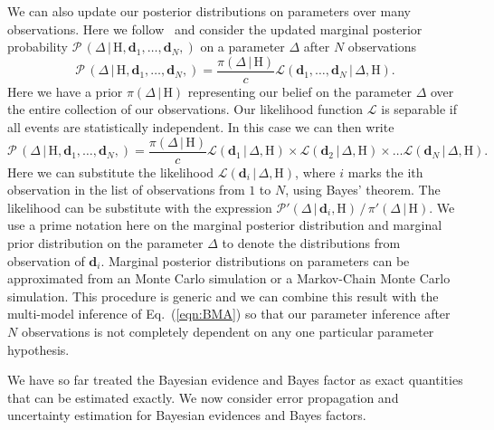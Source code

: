 We can also update our posterior distributions on parameters over many observations. Here we follow~\cite{dpac_technical} and consider the updated marginal posterior probability $\mathcal{P} \, \left(\Delta \, | \, \mathrm{H}, \mathbf{d}_1, \ldots, \mathbf{d}_N, \right)$ on a parameter $\Delta$ after $N$ observations
\begin{equation}
    \mathcal{P} \, \left(\Delta \, | \, \mathrm{H}, \mathbf{d}_1, \ldots, \mathbf{d}_N, \right) = \frac{\pi (\Delta \, | \, \mathrm{H} )}{c} \mathcal{L} (\mathbf{d}_1, \ldots, \mathbf{d}_N \, | \, \Delta , \mathrm{H}). 
\end{equation}
Here we have a prior $\pi (\Delta \, | \, \mathrm{H} )$ representing our belief on the parameter $\Delta$ over the entire collection of our observations. Our likelihood function $\mathcal{L}$ is separable if all events are statistically independent. In this case we can then write
\begin{equation}
    \mathcal{P} \, \left(\Delta \, | \, \mathrm{H}, \mathbf{d}_1, \ldots, \mathbf{d}_N, \right) = \frac{\pi (\Delta \, | \, \mathrm{H} )}{c} \mathcal{L} (\mathbf{d}_1  \, | \, \Delta , \mathrm{H}) \times \mathcal{L} (\mathbf{d}_2  \, | \, \Delta , \mathrm{H}) \times \ldots \mathcal{L} (\mathbf{d}_N  \, | \, \Delta , \mathrm{H}).
\end{equation}
Here we can substitute the likelihood $\mathcal{L}(\mathbf{d}_i  \, | \, \Delta , \mathrm{H})$, where $i$ marks the ith observation in the list of observations from $1$ to $N$, using Bayes' theorem. The likelihood can be substitute with the expression $\mathcal{P}' (\Delta \, | \, \mathbf{d}_i, \mathrm{H}) \, / \, \pi'(\Delta \, | \, \mathrm{H})$. We use a prime notation here on the marginal posterior distribution and marginal prior distribution on the parameter $\Delta$ to denote the distributions from observation of $\mathbf{d}_i$. Marginal posterior distributions on parameters can be approximated from an Monte Carlo simulation or a Markov-Chain Monte Carlo simulation. This procedure is generic and we can combine this result with the multi-model inference of Eq.~(\ref{eqn:BMA}) so that our parameter inference after $N$ observations is not completely dependent on any one particular parameter hypothesis.

We have so far treated the Bayesian evidence and Bayes factor as exact quantities that can be estimated exactly. We now consider error propagation and uncertainty estimation for Bayesian evidences and Bayes factors.

